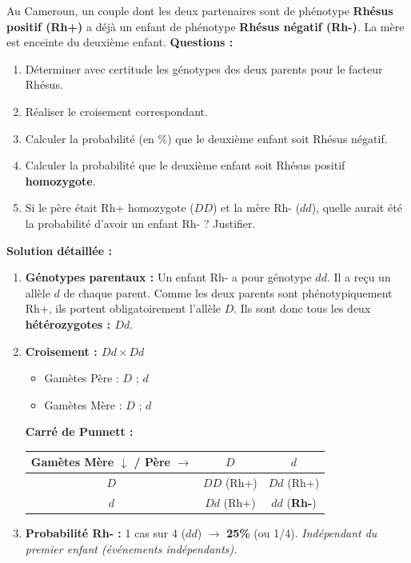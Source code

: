 \documentclass[11pt]{article}
\begin{document}
\begin{exoresolu}
Au Cameroun, un couple dont les deux partenaires sont de phénotype \textbf{Rhésus positif (Rh+)} a déjà un enfant de phénotype \textbf{Rhésus négatif (Rh-)}. La mère est enceinte du deuxième enfant.
\textbf{Questions :}
\begin{enumerate}
    \item Déterminer avec certitude les génotypes des deux parents pour le facteur Rhésus.
    \item Réaliser le croisement correspondant.
    \item Calculer la probabilité (en \%) que le deuxième enfant soit Rhésus négatif.
    \item Calculer la probabilité que le deuxième enfant soit Rhésus positif \textbf{homozygote}.
    \item Si le père était Rh+ homozygote ($DD$) et la mère Rh- ($dd$), quelle aurait été la probabilité d'avoir un enfant Rh- ? Justifier.
\end{enumerate}
\tcblower
\textbf{Solution détaillée :}
\begin{enumerate}
    \item \textbf{Génotypes parentaux :} Un enfant Rh- a pour génotype \textbf{$dd$}. Il a reçu un allèle $d$ de chaque parent. Comme les deux parents sont phénotypiquement Rh+, ils portent obligatoirement l'allèle $D$. Ils sont donc tous les deux \textbf{hétérozygotes : $Dd$}.
    \item \textbf{Croisement : $Dd \times Dd$}
    \begin{itemize}
        \item Gamètes Père : $D$ ; $d$
        \item Gamètes Mère : $D$ ; $d$
    \end{itemize}
    \textbf{Carré de Punnett :}
    \begin{center}
        \begin{tabular}{|c|c|c|}
            \hline
            \textbf{Gamètes Mère $\downarrow$ / Père $\rightarrow$} & \textbf{$D$} & \textbf{$d$} \\ \hline
            \textbf{$D$} & $DD$ (Rh+) & $Dd$ (Rh+) \\ \hline
            \textbf{$d$} & $Dd$ (Rh+) & $dd$ (\textbf{Rh-}) \\ \hline
        \end{tabular}
    \end{center}
    \item \textbf{Probabilité Rh- :} 1 cas sur 4 ($dd$) $\rightarrow$ \textbf{25\%} (ou 1/4). \emph{Indépendant du premier enfant (événements indépendants).}

\end{enumerate}
\end{exoresolu}
\end{document}
